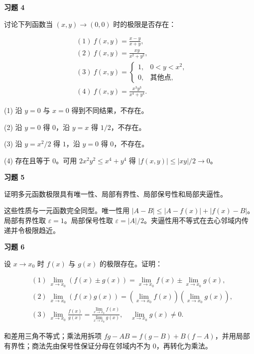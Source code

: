 \begin{exercisebox}
\textbf{习题 4}

讨论下列函数当 \((x,y)\to(0,0)\) 时的极限是否存在：

\[
      \begin{aligned}
      &(1)\ f(x,y)=\frac{x-y}{x+y},\\
      &(2)\ f(x,y)=\frac{xy}{x^2+y^2},\\
      &(3)\ f(x,y)=
      \begin{cases}
      1,&0< y< x^2,\\
      0,&\text{其他点},
      \end{cases}\\
      &(4)\ f(x,y)=\frac{x^3y^3}{x^4+y^4}.
      \end{aligned}
      \]

\begin{hintbox}
(1) 沿 \(y=0\) 与 \(x=0\) 得到不同结果，不存在。

(2) 沿 \(y=0\) 得 \(0\)，沿 \(y=x\) 得 \(1/2\)，不存在。

(3) 沿 \(y=x^2/2\) 得 \(1\)，沿 \(y=0\) 得 \(0\)，不存在。

(4) 存在且等于 \(0\)。可用 \(2x^2y^2\le x^4+y^4\) 得 \(|f(x,y)|\le |xy|/2\to0\)。
\end{hintbox}
\end{exercisebox}

\begin{exercisebox}
\textbf{习题 5}

证明多元函数极限具有唯一性、局部有界性、局部保号性和局部夹逼性。

\begin{hintbox}
这些性质与一元函数完全同型。唯一性用 \(|A-B|\le |A-f(x)|+|f(x)-B|\)。局部有界性取 \(\varepsilon=1\)。局部保号性取 \(\varepsilon=|A|/2\)。夹逼性用不等式在去心邻域内传递并令极限趋近。
\end{hintbox}
\end{exercisebox}

\begin{exercisebox}
\textbf{习题 6}

设 \(x\to x_0\) 时 \(f(x)\) 与 \(g(x)\) 的极限存在。证明：

\[
      \begin{aligned}
      &(1)\ \lim_{x\to x_0}(f(x)\pm g(x))=\lim_{x\to x_0}f(x)\pm\lim_{x\to x_0}g(x),\\
      &(2)\ \lim_{x\to x_0}(f(x)g(x))=\left(\lim_{x\to x_0}f(x)\right)\left(\lim_{x\to x_0}g(x)\right),\\
      &(3)\ \lim_{x\to x_0}\frac{f(x)}{g(x)}
      =\frac{\lim_{x\to x_0}f(x)}{\lim_{x\to x_0}g(x)},\quad \lim_{x\to x_0}g(x)\ne0.
      \end{aligned}
      \]

\begin{hintbox}
和差用三角不等式；乘法用拆项 \(fg-AB=f(g-B)+B(f-A)\)，并用局部有界性；商法先由保号性保证分母在邻域内不为 \(0\)，再转化为乘法。
\end{hintbox}
\end{exercisebox}

